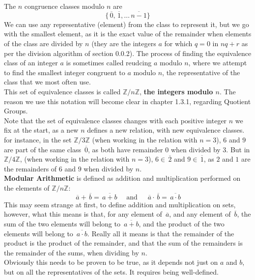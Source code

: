 \documentclass[12pt]{article}
\newcommand{\Z}{\mathbb{Z}}
\newcommand{\olsi}[1]{\,\overline{{#1}}}
\begin{document}
    The $n$ congruence classes modulo $n$ are
    \[ \{ \olsi{0}, \olsi{1}, \dots \olsi{n-1} \} \]
    We can use any representative (element) from the class
    to represent it,
    but we go with the smallest element,
    as it is the exact value of the remainder
    when elements of the class are divided by $n$
    (they are the integers $a$ for which $q = 0$ in $nq + r$
    as per the division algorithm of section 0.0.2).
    The process of finding the equivalence class of an integer $a$
    is sometimes called reudcing $a$ modulo $n$,
    where we attempt to find
    the smallest integer congruent to $a$ modulo $n$,
    the representative of the class that we most often use. \\
    This set of equivalence classes is called $\Z/n\Z$,
    \textbf{the integers modulo $\mathbf{\textit{n}}$}.
    The reason we use this notation will become clear
    in chapter 1.3.1, regarding Quotient Groups. \\

    Note that the set of equivalence classes changes with
    each positive integer $n$ we fix at the start,
    as a new $n$ defines a new relation,
    with new equivalence classes.
    for instance, in the set $\Z/3\Z$
    (when working in the relation with $n = 3$),
    $6$ and $9$ are part of the same class $\olsi{0}$,
    as both have remainder $0$ when divided by $3$. 
    But in $\Z/4\Z$,
    (when working in the relation with $n = 3$),
    $6 \in \olsi{2}$ and $9 \in \olsi{1}$,
    as $2$ and $1$ are the remainders of $6$ and $9$
    when divided by $n$. \\

    \textbf{Modular Arithmetic} is defined as addition and multiplication
    performed on the elements of $\Z/n\Z$:
    \[ \olsi{a} + \olsi{b} = \olsi{a + b} 
    \quad \text{ and } \quad
    \olsi{a} \cdot \olsi{b} = \olsi{a \cdot b} \]
    This may seem strange at first,
    to define addition and multiplication on sets,
    however,
    what this means is that,
    for any element of $\olsi{a}$,
    and any element of $\olsi{b}$,
    the sum of the two elements will belong to $\olsi{a + b}$,
    and the product of the two elements
    will belong to $\olsi{a \cdot b}$.
    Really all it means is that the remainder of the product
    is the product of the remainder,
    and that the sum of the remainders is the remainder of the sums,
    when dividing by $n$. \\
    Obviously this needs to be proven to be true,
    as it depends not just on $a$ and $b$,
    but on all the representatives of the sets. 
    It requires being well-defined. \\
\end{document}
